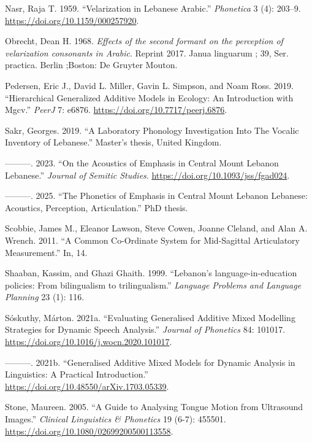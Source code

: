 \documentclass[
]{interact}
\newlength{\cslhangindent}
\newenvironment{CSLReferences}[2] %
 {\begin{list}{}{%
  \setlength{\itemindent}{0pt}
  \setlength{\leftmargin}{0pt}
  \setlength{\parsep}{0pt}
  \ifodd #1
   \setlength{\leftmargin}{\cslhangindent}
   \setlength{\itemindent}{-1\cslhangindent}
  \fi
  \setlength{\itemsep}{#2\baselineskip}}}
 {\end{list}}
\begin{document}
\begin{CSLReferences}{1}{0}
Nasr, Raja T. 1959. {``Velarization in Lebanese Arabic.''}
\emph{Phonetica} 3 (4): 203--9. \url{https://doi.org/10.1159/000257920}.

Obrecht, Dean H. 1968. \emph{Effects of the second formant on the
perception of velarization consonants in Arabic}. Reprint 2017. Janua
linguarum ; 39, Ser. practica. Berlin ;Boston: De Gruyter Mouton.

Pedersen, Eric J., David L. Miller, Gavin L. Simpson, and Noam Ross.
2019. {``Hierarchical Generalized Additive Models in Ecology: An
Introduction with Mgcv.''} \emph{PeerJ} 7: e6876.
\url{https://doi.org/10.7717/peerj.6876}.

Sakr, Georges. 2019. {``A Laboratory Phonology Investigation Into The
Vocalic Inventory of Lebanese.''} Master's thesis, United Kingdom.

---------. 2023. {``On the Acoustics of Emphasis in Central Mount
Lebanon Lebanese.''} \emph{Journal of Semitic Studies}.
\url{https://doi.org/10.1093/jss/fgad024}.

---------. 2025. {``The Phonetics of Emphasis in Central Mount Lebanon
Lebanese: Acoustics, Perception, Articulation.''} PhD thesis.

Scobbie, James M., Eleanor Lawson, Steve Cowen, Joanne Cleland, and Alan
A. Wrench. 2011. {``A Common Co-Ordinate System for Mid-Sagittal
Articulatory Measurement.''} In, 14.

Shaaban, Kassim, and Ghazi Ghaith. 1999. {``Lebanon's
language-in-education policies: From bilingualism to trilingualism.''}
\emph{Language Problems and Language Planning} 23 (1): 116.

Sóskuthy, Márton. 2021a. {``Evaluating Generalised Additive Mixed
Modelling Strategies for Dynamic Speech Analysis.''} \emph{Journal of
Phonetics} 84: 101017. \url{https://doi.org/10.1016/j.wocn.2020.101017}.

---------. 2021b. {``Generalised Additive Mixed Models for Dynamic
Analysis in Linguistics: A Practical Introduction.''}
\url{https://doi.org/10.48550/arXiv.1703.05339}.

Stone, Maureen. 2005. {``A Guide to Analysing Tongue Motion from
Ultrasound Images.''} \emph{Clinical Linguistics \& Phonetics} 19 (6-7):
455501. \url{https://doi.org/10.1080/02699200500113558}.


\end{CSLReferences}
\end{document}
